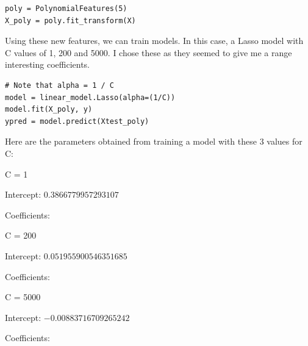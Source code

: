 \documentclass[10pt]{article}
\begin{document}
\begin{lstlisting}
poly = PolynomialFeatures(5)
X_poly = poly.fit_transform(X)
\end{lstlisting}

Using these new features, we can train models. In this case, a Lasso model with
C values of 1, 200 and 5000. I chose these as they seemed to give me a range interesting
coefficients. 

\begin{lstlisting}
# Note that alpha = 1 / C
model = linear_model.Lasso(alpha=(1/C))
model.fit(X_poly, y)
ypred = model.predict(Xtest_poly)
\end{lstlisting}
Here are the parameters obtained from training a model with these 3 values for C:



\vspace{5mm} %

C = 1
\par
Intercept: $0.3866779957293107$
\par
Coefficients:
\begin{equation*}
    [0, 0, 0, 0, -0, -0, 0, 0, 0, 0, 0, -0, 0, -0, -0, 0, 0, 0, 0, 0, 0]    
\end{equation*}

\vspace{5mm} %

C = 200
\par
Intercept: $0.051955900546351685$
\par
Coefficients:
\begin{equation*}
    [ 0, -0.00314985, 0.96742042, 0.87629499, -0.00654177, 0.00630364, 
\end{equation*}
\begin{equation*}
    -0, 0, -0, 0, 0.06296949, -0, 0, -0, 0,-0, 0,-0, 0, -0, -0]    
\end{equation*}

\vspace{5mm} %

C = 5000
\par
Intercept: $-0.00883716709265242$
\par
Coefficients:
\begin{equation*}
    [ 0, 0, 1.00631362, 0.88266399, -0.07027632, 0.23958815,
\end{equation*}
\begin{equation*}
    0.30758898, 0,-0.44969477, -0.0277997, 0.14749331, -0.00335293,
\end{equation*}
\begin{equation*}
    -0.10920998, 0.05252247, -0.15571219, -0.36071504, 0.19936564,
\end{equation*}
\begin{equation*}
    0.22193872, -0.22696517, 0.32680584, -0.]
\end{equation*}
\end{document}
